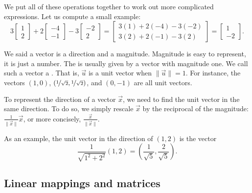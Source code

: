 We put all of these operations together to work out more complicated expressions.
Let us compute a small example:
\begin{equation*}
3
\begin{bmatrix}
1 \\ 2
\end{bmatrix}
+
2
\begin{bmatrix}
-4 \\ -1
\end{bmatrix} 
-
3
\begin{bmatrix}
-2 \\ 2
\end{bmatrix} 
=
\begin{bmatrix}
3(1)+2(-4)-3(-2) \\ 3(2)+2(-1)-3(2)
\end{bmatrix}
=
\begin{bmatrix}
1 \\ -2
\end{bmatrix}
.
\end{equation*}

\medskip

We said a vector is a direction and a magnitude.  Magnitude is easy to
represent, it is just a number.  The \emph{} is usually
given by a vector with magnitude one.  We call such a vector a
\emph{}.  That is, $\vec{u}$ is a unit vector when
$\lVert \vec{u} \rVert = 1$.  For instance, the vectors $(1,0)$,
$(\nicefrac{1}{\sqrt{2}},\nicefrac{1}{\sqrt{2}})$, and $(0,-1)$ are all
unit vectors.

To represent the direction of a vector $\vec{x}$, we need to find the 
unit vector in the same direction.  To do so, we simply rescale
$\vec{x}$ by the reciprocal of the magnitude:
$\frac{1}{\lVert \vec{x} \rVert} \vec{x}$, or more concisely,
$\frac{\vec{x}}{\lVert \vec{x} \rVert}$.

As an example, the unit vector in the direction of $(1,2)$ is the vector
\begin{equation*}
\frac{1}{\sqrt{1^2+2^2}} (1,2)
=
\left( \frac{1}{\sqrt{5}}, \frac{2}{\sqrt{5}} \right) .
\end{equation*}

\subsection{Linear mappings and matrices}

